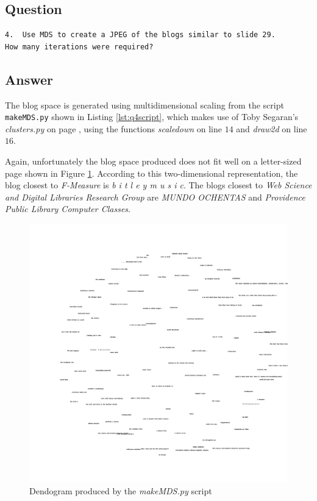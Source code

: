 \documentclass[letterpaper,11pt]{article}
\begin{document}
\subsection*{Question}

\begin{verbatim}
4.  Use MDS to create a JPEG of the blogs similar to slide 29.  
How many iterations were required?
\end{verbatim}

\subsection*{Answer}

The blog space is generated using multidimensional scaling from the script \verb+makeMDS.py+ shown in Listing \ref{lst:q4script}, which makes use of Toby Segaran's \emph{clusters.py} \cite{pci} on page \pageref{lst:appSegaran2}, using the functions \emph{scaledown} on line $14$ and \emph{draw2d} on line $16$.



Again, unfortunately the blog space produced does not fit well on a letter-sized page shown in Figure \ref{fig:q4MDS}.  According to this two-dimensional representation, the blog closest to \emph{F-Measure} is \emph{b i t l e y m u s i c}.  The blogs closest to \emph{Web Science and Digital Libraries Research Group} are \emph{MUNDO OCHENTAS} and \emph{Providence Public Library Computer Classes}.

\clearpage
\begin{figure}[h]
\centerline{\includegraphics[scale=0.26]{q4/blogs2d.jpg}}
\caption{Dendogram produced by the \emph{makeMDS.py} script}
\label{fig:q4MDS}
\end{figure}
\end{document}
